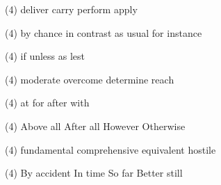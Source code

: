 \begin{tasks}(4)
	\task deliver
	\task carry
	\task perform
	\task apply
\end{tasks}
\item
\begin{tasks}(4)
	\task by chance
	\task in contrast
	\task as usual
	\task for instance
\end{tasks}
\item
\begin{tasks}(4)
	\task if
	\task unless
	\task as
	\task lest
\end{tasks}
\item
\begin{tasks}(4)
	\task moderate
	\task overcome
	\task determine
	\task reach
\end{tasks}
\item
\begin{tasks}(4)
	\task at
	\task for
	\task after
	\task with
\end{tasks}
\item
\begin{tasks}(4)
	\task Above all
	\task After all
	\task However
	\task Otherwise
\end{tasks}
\item
\begin{tasks}(4)
	\task fundamental
	\task comprehensive
	\task equivalent
	\task hostile
\end{tasks}
\item
\begin{tasks}(4)
	\task By accident
	\task In time
	\task So far
	\task Better still
\end{tasks}